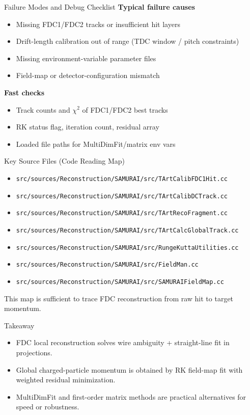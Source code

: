 \documentclass[aspectratio=169]{beamer}
\begin{document}
\begin{frame}{Failure Modes and Debug Checklist}
\textbf{Typical failure causes}
\begin{itemize}
\item Missing FDC1/FDC2 tracks or insufficient hit layers
\item Drift-length calibration out of range (TDC window / pitch constraints)
\item Missing environment-variable parameter files
\item Field-map or detector-configuration mismatch
\end{itemize}

\vspace{0.2cm}
\textbf{Fast checks}
\begin{itemize}
\item Track counts and \(\chi^2\) of FDC1/FDC2 best tracks
\item RK status flag, iteration count, residual array
\item Loaded file paths for MultiDimFit/matrix env vars
\end{itemize}
\end{frame}

\begin{frame}{Key Source Files (Code Reading Map)}
\small
\begin{itemize}
\item \texttt{src/sources/Reconstruction/SAMURAI/src/TArtCalibFDC1Hit.cc}
\item \texttt{src/sources/Reconstruction/SAMURAI/src/TArtCalibDCTrack.cc}
\item \texttt{src/sources/Reconstruction/SAMURAI/src/TArtRecoFragment.cc}
\item \texttt{src/sources/Reconstruction/SAMURAI/src/TArtCalcGlobalTrack.cc}
\item \texttt{src/sources/Reconstruction/SAMURAI/src/RungeKuttaUtilities.cc}
\item \texttt{src/sources/Reconstruction/SAMURAI/src/FieldMan.cc}
\item \texttt{src/sources/Reconstruction/SAMURAI/src/SAMURAIFieldMap.cc}
\end{itemize}

\vspace{0.2cm}
This map is sufficient to trace FDC reconstruction from raw hit to target momentum.
\end{frame}

\begin{frame}{Takeaway}
\begin{itemize}
\item FDC local reconstruction solves wire ambiguity + straight-line fit in projections.
\item Global charged-particle momentum is obtained by RK field-map fit with weighted residual minimization.
\item MultiDimFit and first-order matrix methods are practical alternatives for speed or robustness.
\end{itemize}
\end{frame}
\end{document}
